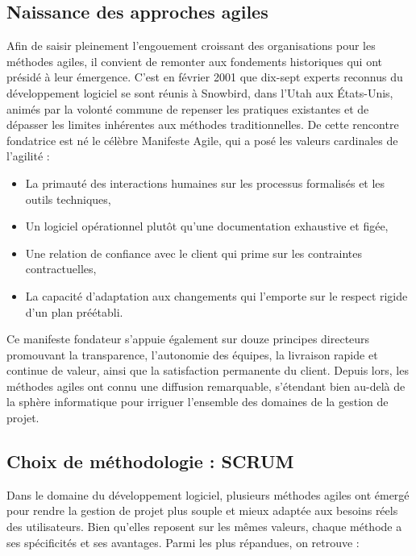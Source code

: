  \subsection{Naissance des approches agiles }
Afin de saisir pleinement l'engouement croissant des organisations pour les méthodes agiles, il convient de remonter aux fondements historiques qui ont présidé à leur émergence. C'est en février 2001 que dix-sept experts reconnus du développement logiciel se sont réunis à Snowbird, dans l'Utah aux États-Unis, animés par la volonté commune de repenser les pratiques existantes et de dépasser les limites inhérentes aux méthodes traditionnelles. De cette rencontre fondatrice est né le célèbre Manifeste Agile, qui a posé les valeurs cardinales de l'agilité :

	\begin{itemize}[label=\textbullet]
	\item La primauté des interactions humaines sur les processus formalisés et les outils techniques,
 	\item Un logiciel opérationnel plutôt qu'une documentation exhaustive et figée,
    \item Une relation de confiance avec le client qui prime sur les contraintes contractuelles,
 	\item La capacité d'adaptation aux changements qui l'emporte sur le respect rigide d'un plan préétabli.
		\end{itemize}
        \vspace{0.2cm}
		\par Ce manifeste fondateur s'appuie également sur douze principes directeurs promouvant la transparence, l'autonomie des équipes, la livraison rapide et continue de valeur, ainsi que la satisfaction permanente du client. Depuis lors, les méthodes agiles ont connu une diffusion remarquable, s'étendant bien au-delà de la sphère informatique pour irriguer l'ensemble des domaines de la gestion de projet.



\subsection{Choix de méthodologie : SCRUM} 
Dans le domaine du développement logiciel, plusieurs méthodes agiles ont émergé pour rendre la gestion de projet plus souple et mieux adaptée aux besoins réels des utilisateurs. Bien qu’elles reposent sur les mêmes valeurs, chaque méthode a ses spécificités et ses avantages. Parmi les plus répandues, on retrouve :

